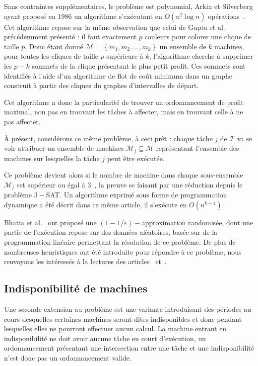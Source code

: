 \documentclass[a4paper,11pt]{report}
\begin{document}
Sans contraintes supplémentaires, le problème est polynomial, Arkin et Silverberg ayant proposé en
1986 un algorithme s'exécutant en $O(n^2 \log n)$ opérations~\cite{arkin_scheduling_1987}. Cet
algorithme repose sur la même observation que celui de Gupta et al.~\cite{gupta_optimal_1978} précédemment présenté : il faut
exactement $p$ couleurs pour colorer une clique de taille $p$. Donc étant donné $\mathcal{M}=\left\{
m_1, m_2, \dots, m_k \right\}$ un ensemble de $k$ machines, pour toutes les cliques de taille
$p$ supérieure à $k$, l'algorithme cherche à supprimer les $p -k$ sommets de la clique présentant
le plus petit profit. Ces sommets sont identifiés à l'aide d'un algorithme de flot de coût minimum
dans un graphe construit à partir des cliques du graphes d'intervalles de départ.

Cet algorithme a donc la particularité de trouver un ordonnancement de profit maximal, non pas en
trouvant les tâches à affecter, mais en trouvant celle à ne pas affecter.

À présent, considérons ce même problème, à ceci prêt : chaque tâche $j$ de $\mathcal{T}$ va se voir
attribuer un ensemble de machines $\mathcal{M}_j \subseteq \mathcal{M}$ représentant l'ensemble des
machines sur lesquelles la tâche $j$ peut être exécutée.

Ce problème devient alors \npc si le nombre de machine dans chaque sous-ensemble $\mathcal{M}_j$ est
supérieur ou égal à $3$~\cite{arkin_scheduling_1987}, la preuve se faisant par une réduction depuis
le problème \textsc{$3-$SAT}. Un algorithme exprimé sous forme de programmation dynamique a été
décrit dans ce même article, il s'exécute en $O(n^{k+1})$.

Bhatia et al.~\cite{bhatia2003algorithmic} ont proposé une $(1 - 1/\varepsilon)-$approximation
randomisée, dont une partie de l'exécution repose sur des données aléatoires, basée sur de la
programmation linéaire permettant la résolution de ce problème. De plus de nombreuses heuristiques
ont été introduite pour répondre à ce problème, nous renvoyons les intéressés à la lectures des
articles~\cite{kroon1995exact} et~\cite{gabrel1995scheduling}.

\subsection{Indisponibilité de machines}

Une seconde extension au problème \bisched{} est une variante introduisant des périodes au cours
desquelles certaines machines seront dites indisponibles et donc pendant lesquelles elles ne
pourront effectuer aucun calcul. La machine entrant en indisponibilité ne doit avoir aucune tâche en
court d'exécution, un ordonnancement présentant une intersection entre une tâche et une
indisponibilité n'est donc pas un ordonnancement valide.
\end{document}
